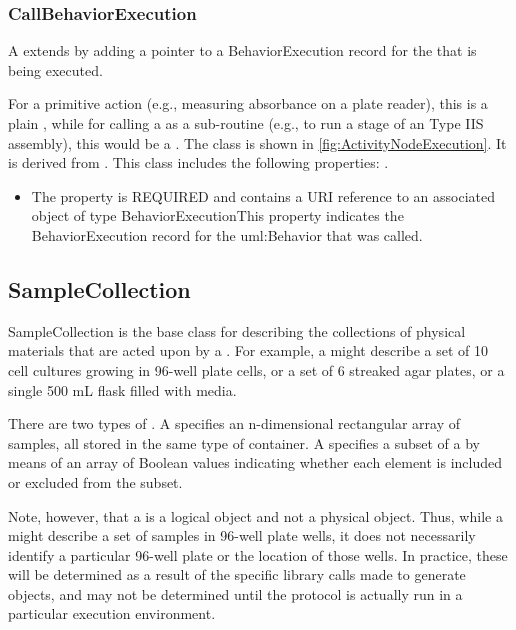 \subsubsection{CallBehaviorExecution}%
\label{sec:paml:CallBehaviorExecution}%
A  extends  by adding a pointer to a BehaviorExecution
        record for the  that is being executed.

        For a primitive action (e.g., measuring absorbance on a plate reader), this is a plain ,
        while for calling a  as a sub-routine (e.g., to run a stage of an Type IIS assembly), this would be a
        .%
\newline%
\linebreak%
The  class is shown in \ref{fig:ActivityNodeExecution}. It is derived from .%
This class includes the following properties: . %
\begin{itemize}%
\item%
The  property is REQUIRED and contains a URI reference to an associated object of type BehaviorExecutionThis property indicates the BehaviorExecution record for the uml:Behavior that was called.%
\end{itemize}%
\subsection{SampleCollection}%
\label{sec:paml:SampleCollection}%
SampleCollection is the base class for describing the collections of physical materials that are
         acted upon by a . For example, a  might describe a set of 10 cell cultures growing in
         96-well plate cells, or a set of 6 streaked agar plates, or a single 500 mL flask filled with media.

         There are two types of . A  specifies an n-dimensional rectangular array of samples,
         all stored in the same type of container. A  specifies a subset of a  by means of an
         array of Boolean values indicating whether each element is included or excluded from the subset.

         Note, however, that a  is a logical object and not a physical object. Thus, while a
          might describe a set of samples in 96-well plate wells, it does not necessarily identify
         a particular 96-well plate or the location of those wells.  In practice, these will be determined as a
         result of the specific library calls made to generate  objects, and may not be determined
         until the protocol is actually run in a particular execution environment.

